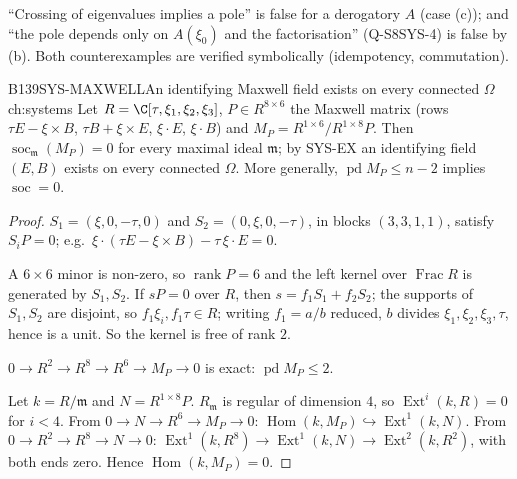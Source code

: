 \begin{caution}[title=Statements that are false]
``Crossing of eigenvalues implies a pole'' is false for a derogatory $A$ (case (c)); and ``the pole depends only on $A(\xi_0)$ and the factorisation'' (Q-S8SYS-4) is false by (b). Both counterexamples are verified symbolically (idempotency, commutation).
\end{caution}

\begin{dimcard}{B139}{SYS-MAXWELL}{An identifying Maxwell field exists on every connected $\Omega$}{\pw}{ch:systems}
Let $R=\C[\tau,\xi_1,\xi_2,\xi_3]$, $P\in R^{8\times6}$ the Maxwell matrix (rows $\tau E-\xi\times B$, $\tau B+\xi\times E$, $\xi\cdot E$, $\xi\cdot B$) and $M_P=R^{1\times6}/R^{1\times8}P$. Then $\operatorname{soc}_{\mathfrak m}(M_P)=0$ for every maximal ideal $\mathfrak m$; by SYS-EX an identifying field $(E,B)$ exists on every connected $\Omega$. More generally, $\operatorname{pd}M_P\le n-2$ implies $\operatorname{soc}=0$.
\end{dimcard}

\begin{proof}
$S_1=(\xi,0,-\tau,0)$ and $S_2=(0,\xi,0,-\tau)$, in blocks $(3,3,1,1)$, satisfy $S_iP=0$; e.g.\ $\xi\cdot(\tau E-\xi\times B)-\tau\,\xi\cdot E=0$.

A $6\times6$ minor is non-zero, so $\operatorname{rank}P=6$ and the left kernel over $\operatorname{Frac}R$ is generated by $S_1,S_2$. If $sP=0$ over $R$, then $s=f_1S_1+f_2S_2$; the supports of $S_1,S_2$ are disjoint, so $f_1\xi_i,f_1\tau\in R$; writing $f_1=a/b$ reduced, $b$ divides $\xi_1,\xi_2,\xi_3,\tau$, hence is a unit. So the kernel is free of rank $2$.

$0\to R^2\to R^8\to R^6\to M_P\to0$ is exact: $\operatorname{pd}M_P\le2$.

Let $k=R/\mathfrak m$ and $N=R^{1\times8}P$. $R_{\mathfrak m}$ is regular of dimension $4$, so $\operatorname{Ext}^i(k,R)=0$ for $i<4$. From $0\to N\to R^6\to M_P\to0$: $\operatorname{Hom}(k,M_P)\hookrightarrow\operatorname{Ext}^1(k,N)$. From $0\to R^2\to R^8\to N\to0$: $\operatorname{Ext}^1(k,R^8)\to\operatorname{Ext}^1(k,N)\to\operatorname{Ext}^2(k,R^2)$, with both ends zero. Hence $\operatorname{Hom}(k,M_P)=0$.

\end{proof}

